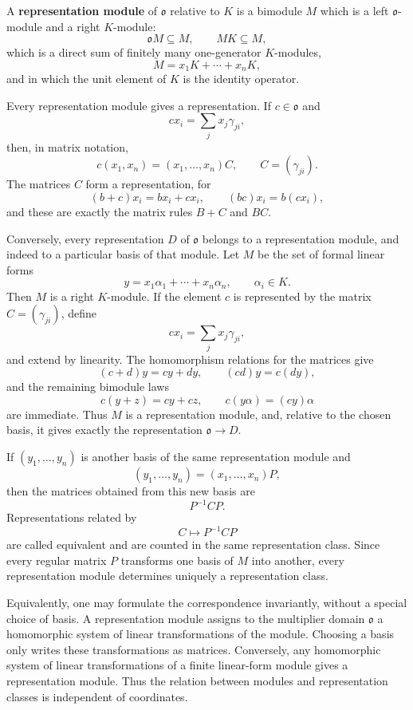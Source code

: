 \documentclass[11pt]{article}
\begin{document}
A \textbf{representation module} of \(\mathfrak{o}\) relative to \(K\)
is a bimodule \(M\) which is a left \(\mathfrak{o}\)-module and a right
\(K\)-module: \[
  \mathfrak{o}M\subseteq M,
  \qquad
  MK\subseteq M,
\] which is a direct sum of finitely many one-generator \(K\)-modules,
\[
  M=x_1K+\cdots+x_nK,
\] and in which the unit element of \(K\) is the identity operator.

Every representation module gives a representation. If
\(c\in\mathfrak{o}\) and \[
  cx_i=\sum_j x_j\gamma_{ji},
\] then, in matrix notation, \[
  c(x_1,
x_n)=(x_1,\ldots,x_n)C,
  \qquad C=(\gamma_{ji}).
\] The matrices \(C\) form a representation, for \[
  (b+c)x_i=bx_i+cx_i,
  \qquad
  (bc)x_i=b(cx_i),
\] and these are exactly the matrix rules \(B+C\) and \(BC\).

Conversely, every representation \(D\) of \(\mathfrak{o}\) belongs to a
representation module, and indeed to a particular basis of that module.
Let \(M\) be the set of formal linear forms \[
  y=x_1\alpha_1+\cdots+x_n\alpha_n,
  \qquad \alpha_i\in K.
\] Then \(M\) is a right \(K\)-module. If the element \(c\) is
represented by the matrix \(C=(\gamma_{ji})\), define \[
  cx_i=\sum_j x_j\gamma_{ji},
\] and extend by linearity. The homomorphism relations for the matrices
give \[
  (c+d)y=cy+dy,
  \qquad
  (cd)y=c(dy),
\] and the remaining bimodule laws \[
  c(y+z)=cy+cz,
  \qquad
  c(y\alpha)=(cy)\alpha
\] are immediate. Thus \(M\) is a representation module, and, relative
to the chosen basis, it gives exactly the representation
\(\mathfrak{o}\to D\).

If \((y_1,\ldots,y_n)\) is another basis of the same representation
module and \[
  (y_1,\ldots,y_n)=(x_1,\ldots,x_n)P,
\] then the matrices obtained from this new basis are \[
  P^{-1}CP.
\] Representations related by \[
  C\mapsto P^{-1}CP
\] are called equivalent and are counted in the same representation
class. Since every regular matrix \(P\) transforms one basis of \(M\)
into another, every representation module determines uniquely a
representation class.

Equivalently, one may formulate the correspondence invariantly, without
a special choice of basis. A representation module assigns to the
multiplier domain \(\mathfrak{o}\) a homomorphic system of linear
transformations of the module. Choosing a basis only writes these
transformations as matrices. Conversely, any homomorphic system of
linear transformations of a finite linear-form module gives a
representation module. Thus the relation between modules and
representation classes is independent of coordinates.
\end{document}
